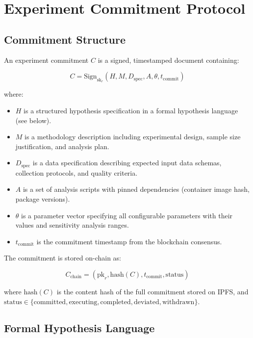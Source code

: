 \section{Experiment Commitment Protocol}

\label{sec:commitments}

\subsection{Commitment Structure}

An experiment commitment $C$ is a signed, timestamped document containing:

\begin{equation}
    C = \text{Sign}_{\text{sk}_r}\left(H, M, D_{\text{spec}}, A, \theta, t_{\text{commit}}\right)
\end{equation}

\noindent where:
\begin{itemize}[leftmargin=*]
    \item $H$ is a structured hypothesis specification in a formal hypothesis language (see below).
    \item $M$ is a methodology description including experimental design, sample size justification, and analysis plan.
    \item $D_{\text{spec}}$ is a data specification describing expected input data schemas, collection protocols, and quality criteria.
    \item $A$ is a set of analysis scripts with pinned dependencies (container image hash, package versions).
    \item $\theta$ is a parameter vector specifying all configurable parameters with their values and sensitivity analysis ranges.
    \item $t_{\text{commit}}$ is the commitment timestamp from the blockchain consensus.
\end{itemize}

The commitment is stored on-chain as:

\begin{equation}
    C_{\text{chain}} = (\text{pk}_r, \text{hash}(C), t_{\text{commit}}, \text{status})
\end{equation}

\noindent where $\text{hash}(C)$ is the content hash of the full commitment stored on IPFS, and $\text{status} \in \{\text{committed}, \text{executing}, \text{completed}, \text{deviated}, \text{withdrawn}\}$.

\subsection{Formal Hypothesis Language}


